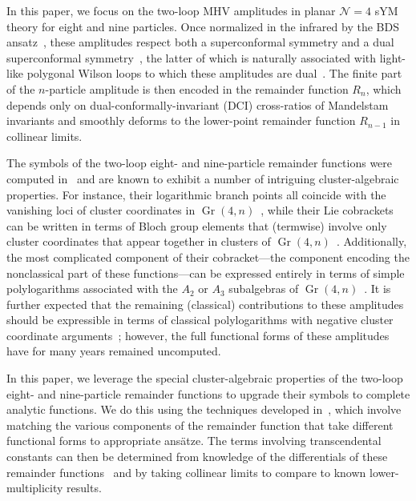 \documentclass[11pt]{article}
\DeclareMathOperator{\Gr}{Gr}
\begin{document}
In this paper, we focus on the two-loop MHV amplitudes in planar $\mathcal{N}=4$ sYM theory for eight and nine particles. Once normalized in the infrared by the BDS ansatz~\cite{Bern:2005iz}, these amplitudes respect both a superconformal symmetry and a dual superconformal symmetry~\cite{Drummond:2007au,Drummond:2006rz,Bern:2006ew,Bern:2007ct,Alday:2007he}, the latter of which is naturally associated with light-like polygonal Wilson loops to which these amplitudes are dual~\cite{Drummond:2007au,Alday:2007hr,Drummond:2007aua,Brandhuber:2007yx,Drummond:2007cf,Bern:2008ap,Drummond:2008aq}. The finite part of the $n$-particle amplitude is then encoded in the remainder function $R_n$, which depends only on dual-conformally-invariant (DCI) cross-ratios of Mandelstam invariants and smoothly deforms to the lower-point remainder function $R_{n{-}1}$ in collinear limits.

The symbols of the two-loop eight- and nine-particle remainder functions were computed in~\cite{CaronHuot:2011ky} and are known to exhibit a number of intriguing cluster-algebraic properties. For instance, their logarithmic branch points all coincide with the vanishing loci of cluster coordinates in $\Gr(4,n)$~\cite{Golden:2013xva}, while their Lie cobrackets can be written in terms of Bloch group elements that (termwise) involve only cluster coordinates that appear together in clusters of $\Gr(4,n)$~\cite{Golden:2014pua}. Additionally, the most complicated component of their cobracket---the component encoding the nonclassical part of these functions---can be expressed entirely in terms of simple polylogarithms associated with the $A_2$ or $A_3$ subalgebras of $\Gr(4,n)$~\cite{Golden:2014xqa}. It is further expected that the remaining (classical) contributions to these amplitudes should be expressible in terms of classical polylogarithms with negative cluster coordinate arguments~\cite{Golden:2014xqf}; however, the full functional forms of these amplitudes have for many years remained uncomputed. 

In this paper, we leverage the special cluster-algebraic properties of the two-loop eight- and nine-particle remainder functions to upgrade their symbols to complete analytic functions. We do this using the techniques developed in~\cite{Golden:2014xqa,Golden:2014xqf,Golden:2018gtk,Golden:2019kks}, which involve matching the various components of the remainder function that take different functional forms to appropriate ans\"atze. The terms involving transcendental constants can then be determined from knowledge of the differentials of these remainder functions~\cite{CaronHuot:2011ky,Golden:2013lha} and by taking collinear limits to compare to known lower-multiplicity results.
\end{document}
